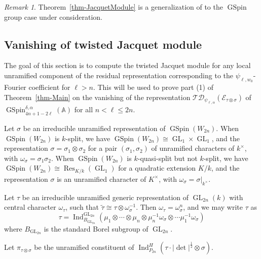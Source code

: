 \documentclass[12pt]{amsart}
\newcommand{\A}{\mathbb{A}}
\newcommand{\Res}{\operatorname{Res}}
\newcommand{\wt}{\widetilde}
\newcommand{\TD}{\mathcal{TD}}
\newcommand{\CE}{{\mathcal{E}}}
\theoremstyle{remark}
\newtheorem{remark}[theorem]{Remark}%
\DeclareMathOperator{\Ind}{Ind}
\DeclareMathOperator{\GL}{GL}
\DeclareMathOperator{\GSpin}{GSpin}
\begin{document}
\begin{remark}
Theorem~\ref{thm-JacquetModule} is a generalization of \cite[Theorem 5.1]{GinzburgRallisSoudry2011} to the $\GSpin$ group case under consideration. 
\end{remark}


\subsection{Vanishing of twisted Jacquet module}
The goal of this section is to compute the twisted Jacquet module for any local unramified component of the residual representation corresponding to the $\psi_{\ell,w_0}$-Fourier coefficient for $\ell>n$. 
This will be used to prove part (1) of Theorem~\ref{thm-Main} on
the vanishing of the representation $\TD_{\psi_{\ell,\alpha}}(\CE_{\tau\otimes\sigma})$ of $\GSpin^{\delta,\alpha}_{4n+1-2\ell}(\A)$ 
for all $n<\ell\leq 2n$.

Let $\sigma$ be an irreducible unramified representation of $\GSpin(W_{2n})$. When $\GSpin(W_{2n})$ is $k$-split, we have $\GSpin(W_{2n})\cong \GL_1 \times \GL_1$, and the representation $\sigma=\sigma_1\otimes\sigma_2$ for a pair $(\sigma_1, \sigma_2)$ of unramified characters  of $k^\times$, with $\omega_\sigma=\sigma_1\sigma_2$. When $\GSpin(W_{2n})$ is $k$-quasi-split but not $k$-split, we have $\GSpin(W_{2n})\cong \Res_{K/k}(\GL_1)$ for a quadratic extension $K/k$, and the representation $\sigma$ is an unramified character of $K^\times$, with $\omega_{\sigma}=\sigma|_{k^\times}$. 

Let $\tau$ be an irreducible unramified generic representation of $\GL_{2n}(k)$ with central character $\omega_{\tau}$, such that $\wt{\tau}\cong \tau\otimes\omega_{\sigma}^{-1}$. Then $\omega_{\tau}=\omega_{\sigma}^n$, and we may write $\tau$ as 
\begin{equation*}
\tau=\Ind_{B_{\GL_{2n}}}^{\GL_{2n}} (\mu_1 \otimes   \cdots \otimes 	\mu_n \otimes \mu_n^{-1}  \omega_{\sigma} \otimes \cdots \mu_1^{-1}\omega_{\sigma})
\end{equation*}
where $B_{\GL_{2n}}$ is the standard Borel subgroup of $\GL_{2n}$. 

Let $\pi_{\tau\otimes\sigma}$ be the unramified constituent of $\Ind_{P_{2n}}^{H}(\tau\cdot |\det|^{\frac{1}{2}}\otimes \sigma)$.
\end{document}
